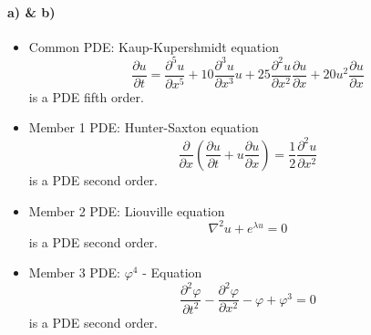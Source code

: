 \paragraph{a) \& b)}
\begin{itemize}
	\item Common PDE: Kaup-Kupershmidt equation
		\begin{equation}
			\frac{\partial u }{\partial t} = \frac{\partial ^5 u}{\partial x^5} + 10 \frac{\partial ^3 u}{\partial x^3} u + 25 \frac{\partial ^2 u}{\partial x^2} \frac{\partial u}{\partial x} + 20 u^2 \frac{\partial u}{\partial x}
		\end{equation}
		\hspace{2.4cm} is a PDE fifth order.
	
	\item Member 1 PDE: Hunter-Saxton equation
		\begin{equation}
			\frac{\partial}{\partial x} \left( \frac{\partial u }{\partial t} + u \frac{\partial u}{\partial x} \right) = \frac{1}{2} \frac{\partial ^2 u}{\partial x^2}
		\end{equation}
		\hspace{2.4cm} is a PDE second order.
	\item Member 2 PDE: Liouville equation
		\begin{equation}
			\nabla ^2 u + e ^{\lambda u} = 0
		\end{equation}
		\hspace{2.4cm} is a PDE second order.
	\item Member 3 PDE: $\varphi ^4$ - Equation
		\begin{equation}
			\frac{\partial ^2 \varphi}{\partial t ^2} - \frac{\partial ^2 \varphi}{\partial x ^2} - \varphi + \varphi ^3 = 0
		\end{equation}
		\hspace{2.4cm} is a PDE second order.
		
\end{itemize}

